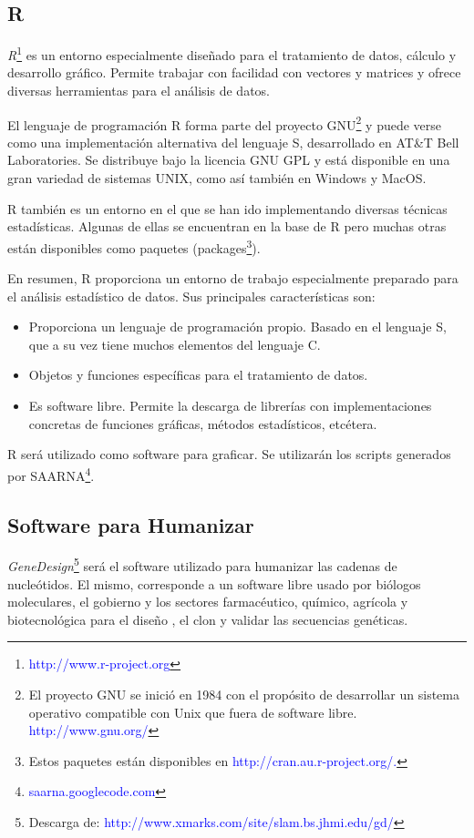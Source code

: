 \documentclass[12pt,a4paper,spanish]{article}
\begin{document}
	\subsection{R}
		\par \textit{R}\footnote{\textcolor{blue}{http://www.r-project.org}} es un entorno especialmente diseñado para el 			tratamiento de datos, cálculo y desarrollo gráfico. Permite trabajar con facilidad con vectores y matrices y 			ofrece diversas herramientas para el análisis de datos.
		\par El lenguaje de programación \textsc{R} forma parte del proyecto GNU\footnote{El proyecto GNU se inició en 			1984 con el propósito de desarrollar un sistema operativo compatible con Unix que fuera de software libre. 			\textcolor{blue}{http://www.gnu.org/}} y puede verse como una 		implementación alternativa del lenguaje 		\textsc{S}, desarrollado en AT\&T Bell Laboratories. Se distribuye bajo la licencia GNU GPL y está disponible en 			una gran variedad de sistemas UNIX, como así también en Windows y MacOS.
		\par \textsc{R} también es un entorno en el que se han ido implementando diversas técnicas estadísticas. Algunas 			de ellas se encuentran en la base de \textsc{R} pero muchas otras están disponibles como paquetes (packages\footnote{Estos paquetes están disponibles en \textcolor{blue}{http://cran.au.r-project.org/.}}).
		\par En resumen, R proporciona un entorno de trabajo especialmente preparado para el análisis estadístico de 			datos. Sus principales características son:

		\begin{itemize}
			\item Proporciona un lenguaje de programación propio. Basado en el lenguaje S, que a su vez tiene muchos 						elementos del lenguaje C. 
			\item Objetos y funciones específicas para el tratamiento de datos.
			\item Es software libre. Permite la descarga de librerías con implementaciones concretas de funciones 						gráficas, métodos estadísticos, etcétera.
		\end{itemize}
		\par \textsc{R} será utilizado como software para graficar. Se utilizarán los scripts generados por 
		SAARNA\footnote{\textcolor{blue}{saarna.googlecode.com}}.

	\subsection{Software para Humanizar}
		\par \emph{GeneDesign}\footnote{Descarga de: \textcolor{blue}{http://www.xmarks.com/site/slam.bs.jhmi.edu/gd/}}  			\cite{4}\cite{5} será el software utilizado para humanizar las cadenas de nucleótidos. El mismo, corresponde 			a un software libre usado por biólogos moleculares, el gobierno y los sectores farmacéutico, químico, agrícola y 			biotecnológica para el diseño \cite{3}, el clon y validar las secuencias genéticas.
\end{document}
